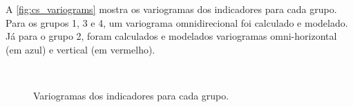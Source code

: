 A \autoref{fig:cs_variograms} mostra os variogramas dos indicadores para cada grupo. Para os grupos 1, 3 e 4, um variograma omnidirecional foi calculado e modelado. Já para o grupo 2, foram calculados e modelados variogramas omni-horizontal (em azul) e vertical (em vermelho).

\begin{figure}[H]
    \caption{Variogramas dos indicadores para cada grupo.} \label{fig:cs_variograms}
     \centering
     \hspace{1em}
     \\

\end{figure}
